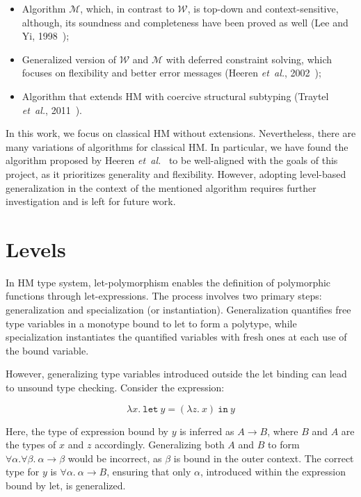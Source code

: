 \begin{itemize}
  \item Algorithm $\mathcal{M}$, which, in contrast to $\mathcal{W}$, is top-down and context-sensitive, although, its soundness and completeness have been proved as well (Lee and Yi, 1998~\cite{lee1998proofs});
  \item Generalized version of $\mathcal{W}$ and $\mathcal{M}$ with deferred constraint solving, which focuses on flexibility and better error messages (Heeren \textit{et~al.}, 2002~\cite{Heeren2002_GeneralizingHM});
  \item Algorithm that extends HM with coercive structural subtyping (Traytel \textit{et~al.}, 2011~\cite{Traytel2011_HMCoerciveSubtyping}).
\end{itemize}

In this work, we focus on classical HM without extensions. Nevertheless, there are many variations of algorithms for classical HM. In particular, we have found the algorithm proposed by Heeren \textit{et~al.}~\cite{Heeren2002_GeneralizingHM} to be well-aligned with the goals of this project, as it prioritizes generality and flexibility. However, adopting level-based generalization in the context of the mentioned algorithm requires further investigation and is left for future work.

\section{Levels}

In HM type system, let-polymorphism enables the definition of polymorphic functions through let-expressions. The process involves two primary steps: generalization and specialization (or instantiation). Generalization quantifies free type variables in a monotype bound to let to form a polytype, while specialization instantiates the quantified variables with fresh ones at each use of the bound variable.

However, generalizing type variables introduced outside the let binding can lead to unsound type checking. Consider the expression:

$$
\lambda x.\ \texttt{let}\ y = (\lambda z.\ x)\ \texttt{in}\ y
$$

Here, the type of expression bound by $y$ is inferred as $A \to B$, where $B$ and $A$ are the types of $x$ and $z$ accordingly. Generalizing both $A$ and $B$ to form $\forall \alpha. \forall \beta.\ \alpha \to \beta$ would be incorrect, as $\beta$ is bound in the outer context. The correct type for $y$ is $\forall \alpha.\ \alpha \to B$, ensuring that only $\alpha$, introduced within the expression bound by let, is generalized.

